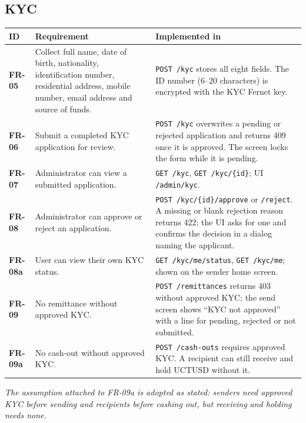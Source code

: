 \documentclass[11pt,a4paper]{article}
\makeatletter
\newcommand{\code}[1]{\texttt{\small #1}}
\newenvironment{frtable}{%
  \rowcolors{2}{white}{rowbg}
  \begin{longtable}{@{}>{\bfseries}l >{\RaggedRight\arraybackslash}p{5.5cm} >{\RaggedRight\arraybackslash}p{8.4cm}@{}}
  \toprule
  \rowcolor{headbg}\textbf{ID} & \textbf{Requirement} & \textbf{Implemented in} \\
  \midrule
  \endhead
  \bottomrule
  \endlastfoot}
 {\end{longtable}}
\newcommand{\tablenote}[1]{{\small\color{ink}\itshape #1\par}}
\makeatother
\begin{document}
\subsection{KYC}
\begin{frtable}
FR-05  & Collect full name, date of birth, nationality, identification number, residential address, mobile number, email address and source of funds.
       & \code{POST /kyc} stores all eight fields. The ID number (6--20 characters) is encrypted with the KYC Fernet key. \\
FR-06  & Submit a completed KYC application for review.
       & \code{POST /kyc} overwrites a pending or rejected application and returns 409 once it is approved. The screen locks the form while it is pending. \\
FR-07  & Administrator can view a submitted application.
       & \code{GET /kyc}, \code{GET /kyc/\{id\}}; UI \code{/admin/kyc}. \\
FR-08  & Administrator can approve or reject an application.
       & \code{POST /kyc/\{id\}/approve} or \code{/reject}. A missing or blank rejection reason returns 422; the UI asks for one and confirms the decision in a dialog naming the applicant. \\
FR-08a & User can view their own KYC status.
       & \code{GET /kyc/me/status}, \code{GET /kyc/me}; shown on the sender home screen. \\
FR-09  & No remittance without approved KYC.
       & \code{POST /remittances} returns 403 without approved KYC; the send screen shows ``KYC not approved'' with a line for pending, rejected or not submitted. \\
FR-09a & No cash-out without approved KYC.
       & \code{POST /cash-outs} requires approved KYC. A recipient can still receive and hold UCTUSD without it. \\
\end{frtable}
\tablenote{The assumption attached to FR-09a is adopted as stated: senders need approved KYC before sending and recipients before cashing out, but receiving and holding needs none.}
\end{document}
